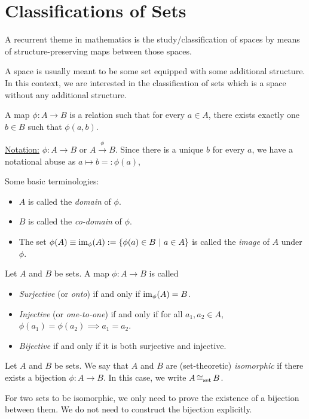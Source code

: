 
\section{Classifications of Sets}

A recurrent theme in mathematics is the study/classification of spaces by means of structure-preserving maps between those spaces.

A space is usually meant to be some set equipped with some additional structure. In this context, we are interested in the classification of sets which is a space without any additional structure.

\begin{definition}[Map]
	A map \(\phi: A \to B\) is a relation such that for every \(a \in A\), there exists exactly one \(b \in B\) such that \(\phi(a, b)\).

	\noindent \uline{Notation:} \(\phi: A \to B\) or \(A \xrightarrow{\phi} B\). Since there is a unique \(b\) for every \(a\), we have a notational abuse as \(a \mapsto b =: \phi(a)\),
\end{definition}
Some basic terminologies:
\begin{itemize}
	\item \(A\) is called the \emph{domain} of \(\phi\).
	\item \(B\) is called the \emph{co-domain} of \(\phi\).
	\item The set \(\phi(A) \equiv \operatorname{im}_\phi(A) := \qty{\phi(a) \in B \ \middle|\ a \in A}\) is called the \emph{image} of \(A\) under \(\phi\).
\end{itemize}

\begin{definition}
	Let \(A\) and \(B\) be sets. A map \(\phi: A \to B\) is called
	\begin{itemize}
		\item \emph{Surjective} (or \emph{onto}) if and only if \(\operatorname{im}_\phi(A) = B\).
		\item \emph{Injective} (or \emph{one-to-one}) if and only if for all \(a_1, a_2 \in A\), \(\phi(a_1) = \phi(a_2) \implies a_1 = a_2\).
		\item \emph{Bijective} if and only if it is both surjective and injective.
	\end{itemize}
\end{definition}

\begin{definition}
	Let \(A\) and \(B\) be sets. We say that \(A\) and \(B\) are (set-theoretic) \emph{isomorphic} if there exists a bijection \(\phi: A \to B\). In this case, we write \(A \operatorname{\cong_{\text{set}}} B\).
\end{definition}
For two sets to be isomorphic, we only need to prove the existence of a bijection between them. We do not need to construct the bijection explicitly.

